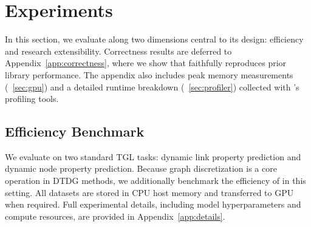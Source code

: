 \section{Experiments} \label{sec:exp}


In this section, we evaluate \name along two dimensions central to its design: efficiency and research extensibility. Correctness results are deferred to Appendix~\ref{app:correctness}, where we show that \name faithfully reproduces prior library performance. The appendix also includes peak memory measurements (~\ref{sec:gpu}) and a detailed runtime breakdown (~\ref{sec:profiler}) collected with \name’s profiling tools.




\subsection{Efficiency Benchmark} \label{sub:efficiency}

We evaluate \name on two standard TGL tasks: dynamic link property prediction and dynamic node property prediction. Because graph discretization is a core operation in DTDG methods, we additionally benchmark the efficiency of \name in this setting. All datasets are stored in CPU host memory and transferred to GPU when required. Full experimental details, including model hyperparameters and compute resources, are provided in Appendix~\ref{app:details}.



